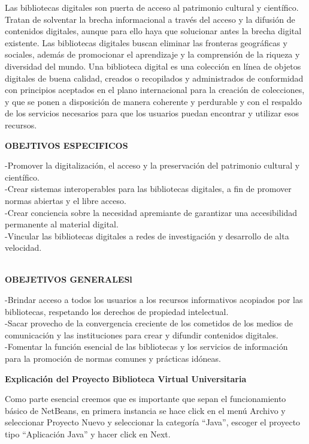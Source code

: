 \documentclass{article}
\begin{document}
\begin{multicols}{2}
Las bibliotecas digitales son puerta de acceso al patrimonio cultural y científico. Tratan de solventar la brecha informacional a través del acceso y la difusión de contenidos digitales, aunque para ello haya que solucionar antes la brecha digital existente. Las bibliotecas digitales buscan eliminar las fronteras geográficas y sociales, además de promocionar el aprendizaje y la comprensión de la riqueza y diversidad del mundo. Una biblioteca digital es una colección en línea de objetos digitales de buena calidad, creados o recopilados y administrados de conformidad con principios aceptados en el plano internacional para la creación de colecciones, y que se ponen a disposición de manera coherente y perdurable y con el respaldo de los servicios necesarios para que los usuarios puedan encontrar y utilizar esos recursos. \\
\begin{center}
\textbf{OBEJTIVOS ESPECIFICOS} 
\end{center}
-Promover la digitalización, el acceso y la preservación del patrimonio cultural y científico. \\
-Crear sistemas interoperables para las bibliotecas digitales, a fin de promover normas abiertas y el libre acceso. \\
-Crear conciencia sobre la necesidad apremiante de garantizar una accesibilidad permanente al material digital. \\
-Vincular las bibliotecas digitales a redes de investigación y desarrollo de alta velocidad.
 \\ \\
\begin{center}
\textbf{OBEJETIVOS GENERALESl} 
\end{center}
-Brindar acceso a todos los usuarios a los recursos informativos acopiados por las bibliotecas, respetando los derechos de propiedad intelectual. \\
-Sacar provecho de la convergencia creciente de los cometidos de los medios de comunicación y las instituciones para crear y difundir contenidos digitales. \\
-Fomentar la función esencial de las bibliotecas y los servicios de información para la promoción de normas comunes y prácticas idóneas. \\
\begin{center}
\textbf{Explicación del Proyecto Biblioteca Virtual Universitaria} 
\end{center}
Como parte esencial creemos que es importante que sepan el funcionamiento básico de NetBeans, en primera instancia se hace click en el menú Archivo y seleccionar Proyecto Nuevo y seleccionar la categoría “Java”, escoger el proyecto tipo “Aplicación Java” y hacer click en Next. \\

\end{multicols}
\end{document}
